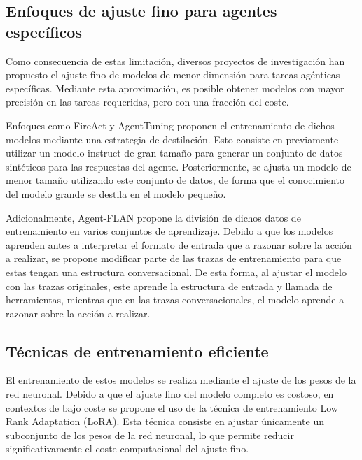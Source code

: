\subsection{Enfoques de ajuste fino para agentes específicos}
Como consecuencia de estas limitación, diversos proyectos de investigación han propuesto el ajuste fino de modelos de menor dimensión para tareas agénticas específicas. Mediante esta aproximación, es posible obtener modelos con mayor precisión en las tareas requeridas, pero con una fracción del coste.

Enfoques como FireAct\cite{chen_fireact_2023} y AgentTuning\cite{zeng_agenttuning_2023} proponen el entrenamiento de dichos modelos mediante una estrategia de destilación. Esto consiste en previamente utilizar un modelo instruct de gran tamaño para generar un conjunto de datos sintéticos para las respuestas del agente. Posteriormente, se ajusta un modelo de menor tamaño utilizando este conjunto de datos, de forma que el conocimiento del modelo grande se destila en el modelo pequeño.

Adicionalmente, Agent-FLAN\cite{chen_agent-flan_2024} propone la división de dichos datos de entrenamiento en varios conjuntos de aprendizaje. Debido a que los modelos aprenden antes a interpretar el formato de entrada que a razonar sobre la acción a realizar, se propone modificar parte de las trazas de entrenamiento para que estas tengan una estructura conversacional.
De esta forma, al ajustar el modelo con las trazas originales, este aprende la estructura de entrada y llamada de herramientas, mientras que en las trazas conversacionales, el modelo aprende a razonar sobre la acción a realizar.

\subsection{Técnicas de entrenamiento eficiente}
El entrenamiento de estos modelos se realiza mediante el ajuste de los pesos de la red neuronal. Debido a que el ajuste fino del modelo completo es costoso, en contextos de bajo coste se propone el uso de la técnica de entrenamiento Low Rank Adaptation (LoRA)\cite{hu_lora_2021}. Esta técnica consiste en ajustar únicamente un subconjunto de los pesos de la red neuronal, lo que permite reducir significativamente el coste computacional del ajuste fino.























